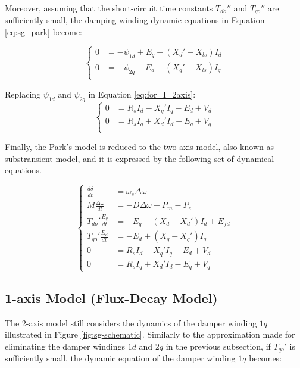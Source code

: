 Moreover, assuming that the short-circuit time constants $T_{do}''$ and
$T_{qo}''$ are sufficiently small, the damping winding dynamic equations in
Equation \ref{eq:sg_park} become:

\begin{equation*}
    \begin{cases}
        0 &= -\psi_{1d} + E_q - (X_d' - X_{ls}) I_d\\
        0 &= -\psi_{2q} - E_d - (X_q' - X_{ls}) I_q\\
    \end{cases}
\end{equation*}

Replacing $\psi_{1d}$ and $\psi_{2q}$ in Equation \ref{eq:for_I_2axis}:
\begin{equation*}
    \begin{cases}
        0 &= R_s I_d - X_q' I_q - E_d + V_d \\
        0 &= R_s I_q + X_d' I_d - E_q + V_q \\
    \end{cases}
\end{equation*}

Finally, the Park's model is reduced to the two-axis model, also known as
substransient model, and it is expressed by the following set of dynamical
equations.

\begin{equation} \label{eq:sg_two_axis}
    \begin{cases}
        \frac{d\delta}{dt} &= \omega_s \Delta\omega\\
        M\frac{\Delta\omega}{dt} &= -D\Delta\omega + P_m - P_e\\
        T_{do}' \frac{E_q}{dt} &= -E_q - (X_d - X_d')I_d + E_{fd}\\
        T_{qo}' \frac{E_d}{dt} &= -E_d + (X_q - X_q')I_q\\
        0 &= R_s I_d - X_q' I_q - E_d + V_d \\
        0 &= R_s I_q + X_d' I_d - E_q + V_q
    \end{cases}
\end{equation}

\subsection{1-axis Model (Flux-Decay Model)}

The 2-axis model still considers the dynamics of the damper winding $1q$
illustrated in Figure \ref{fig:sg-schematic}. Similarly to the approximation
made for eliminating the damper windings $1d$ and $2q$ in the previous
subsection, if $T_{qo}'$ is sufficiently small, the dynamic equation of the
damper winding $1q$ becomes:

